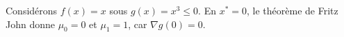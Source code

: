 \begin{example}
    Considérons \( f(x) = x \) sous \( g(x) = x^3 \leq 0 \). En \( x^* = 0 \), le théorème de Fritz John donne \( \mu_0 = 0 \) et \( \mu_1 = 1 \), car \( \nabla g(0) = 0 \).
\end{example}










